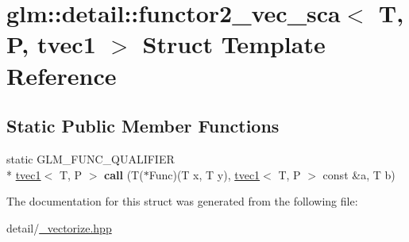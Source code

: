 \hypertarget{structglm_1_1detail_1_1functor2__vec__sca_3_01T_00_01P_00_01tvec1_01_4}{\section{glm\-:\-:detail\-:\-:functor2\-\_\-vec\-\_\-sca$<$ T, P, tvec1 $>$ Struct Template Reference}
\label{structglm_1_1detail_1_1functor2__vec__sca_3_01T_00_01P_00_01tvec1_01_4}
}
\subsection*{Static Public Member Functions}
\begin{DoxyCompactItemize}
\item 
\hypertarget{structglm_1_1detail_1_1functor2__vec__sca_3_01T_00_01P_00_01tvec1_01_4_a2a66b135799442e1bdee02afc859064d}{static G\-L\-M\-\_\-\-F\-U\-N\-C\-\_\-\-Q\-U\-A\-L\-I\-F\-I\-E\-R \\*
\hyperlink{structglm_1_1tvec1}{tvec1}$<$ T, P $>$ {\bfseries call} (T($\ast$Func)(T x, T y), \hyperlink{structglm_1_1tvec1}{tvec1}$<$ T, P $>$ const \&a, T b)}\label{structglm_1_1detail_1_1functor2__vec__sca_3_01T_00_01P_00_01tvec1_01_4_a2a66b135799442e1bdee02afc859064d}

\end{DoxyCompactItemize}


The documentation for this struct was generated from the following file\-:\begin{DoxyCompactItemize}
\item 
detail/\hyperlink{__vectorize_8hpp}{\-\_\-vectorize.\-hpp}\end{DoxyCompactItemize}

